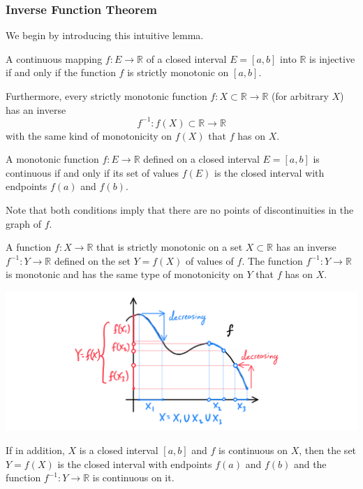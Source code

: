   \subsubsection{Inverse Function Theorem}

    We begin by introducing this intuitive lemma. 
    \begin{lemma}
      A continuous mapping $f: E \longrightarrow \mathbb{R}$ of a closed interval $E = [a,b]$ into $\mathbb{R}$ is injective if and only if the function $f$ is strictly monotonic on $[a,b]$. 

      Furthermore, every strictly monotonic function $f: X \subset \mathbb{R} \longrightarrow \mathbb{R}$ (for arbitrary $X$) has an inverse 
      \[f^{-1}: f(X) \subset \mathbb{R} \longrightarrow \mathbb{R}\]
      with the same kind of monotonicity on $f(X)$ that $f$ has on $X$. 
    \end{lemma}

    \begin{lemma}
      A monotonic function $f: E \longrightarrow \mathbb{R}$ defined on a closed interval $E = [a,b]$ is continuous if and only if its set of values $f(E)$ is the closed interval with endpoints $f(a)$ and $f(b)$. 

      Note that both conditions imply that there are no points of discontinuities in the graph of $f$. 
    \end{lemma}


    \begin{theorem}
    A function $f: X \longrightarrow \mathbb{R}$ that is strictly monotonic on a set $X \subset \mathbb{R}$ has an inverse $f^{-1}: Y \longrightarrow \mathbb{R}$ defined on the set $Y = f(X)$ of values of $f$. The function $f^{-1}: Y \longrightarrow \mathbb{R}$ is monotonic and has the same type of monotonicity on $Y$ that $f$ has on $X$. 
    \begin{center}
        \includegraphics[scale=0.25]{img/Inverse_Function_Theorem_Analysis.PNG}
    \end{center}
    If in addition, $X$ is a closed interval $[a,b]$ and $f$ is continuous on $X$, then the set $Y = f(X)$ is the closed interval with endpoints $f(a)$ and $f(b)$ and the function $f^{-1}: Y \longrightarrow \mathbb{R}$ is continuous on it.
    \end{theorem}

